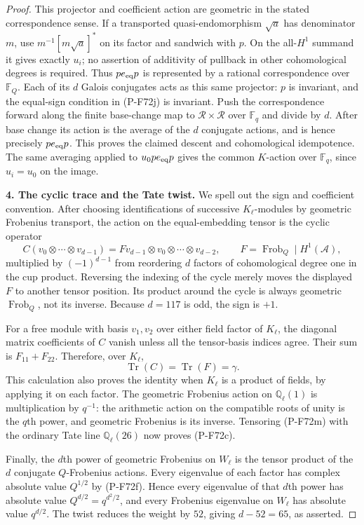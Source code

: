 \begin{proof}
This projector and coefficient action are geometric
in the stated correspondence sense.  If a transported
quasi-endomorphism $\sqrt a$ has denominator $m$, use
$m^{-1}[m\sqrt a]^*$ on its factor and sandwich with
$p$.  On the all-$H^1$ summand it gives exactly $u_i$;
no assertion of additivity of pullback in other
cohomological degrees is required.  Thus $pe_{\rm eq}p$
is represented by a rational correspondence over
$\mathbb F_Q$.  Each of its $d$ Galois conjugates acts
as this same projector: $p$ is invariant, and the
equal-sign condition in (P-F72j) is invariant.
Push the correspondence forward along the finite
base-change map to $\mathcal R\times\mathcal R$ over
$\mathbb F_q$ and divide by $d$.
After base change its action is the average of the
$d$ conjugate actions, and is hence precisely
$pe_{\rm eq}p$.  This proves the claimed descent and
cohomological idempotence.  The same averaging applied
to $u_0pe_{\rm eq}p$ gives the common $K$-action over
$\mathbb F_q$, since $u_i=u_0$ on the image.

\par\medskip\noindent\textbf{4. The cyclic trace and the Tate twist.}
We spell out the sign and coefficient convention.
After choosing identifications of successive $K_\ell$-modules
by geometric Frobenius transport, the action on the
equal-embedding tensor is the cyclic operator
\[
 C(v_0\otimes\cdots\otimes v_{d-1})
       =Fv_{d-1}\otimes v_0\otimes\cdots\otimes v_{d-2},
       \qquad F=\operatorname{Frob}_Q\mid H^1(\mathcal A),
                                                               \tag{P-F72l}
\]
multiplied by $(-1)^{d-1}$ from reordering $d$ factors
of cohomological degree one in the cup product.  Reversing
the indexing of the cycle merely moves the displayed
$F$ to another tensor position.  Its product around
the cycle is always geometric $\operatorname{Frob}_Q$,
not its inverse.  Because $d=117$ is odd, the sign is $+1$.

For a free module with basis $v_1,v_2$ over either field
factor of $K_\ell$, the diagonal matrix coefficients
of $C$ vanish unless all the tensor-basis indices agree.
Their sum is $F_{11}+F_{22}$.  Therefore, over $K_\ell$,
\[
                       \operatorname{Tr}(C)=\operatorname{Tr}(F)
                                              =\gamma.        \tag{P-F72m}
\]
This calculation also proves the identity when
$K_\ell$ is a product of fields, by applying it on
each factor.  The geometric Frobenius action on
$\mathbb Q_\ell(1)$ is multiplication by $q^{-1}$:
the arithmetic action on the compatible roots of
unity is the $q$th power, and geometric Frobenius is
its inverse.  Tensoring (P-F72m) with the ordinary
Tate line $\mathbb Q_\ell(26)$ now proves (P-F72c).

Finally, the $d$th power of geometric Frobenius on
$W_\ell$ is the tensor product of the $d$ conjugate
$Q$-Frobenius actions.  Every eigenvalue of each
factor has complex absolute value $Q^{1/2}$ by
(P-F72f).  Hence every eigenvalue of that $d$th power
has absolute value $Q^{d/2}=q^{d^2/2}$, and every
Frobenius eigenvalue on $W_\ell$ has absolute value
$q^{d/2}$.  The twist reduces the weight by $52$,
giving $d-52=65$, as asserted.
\end{proof}

